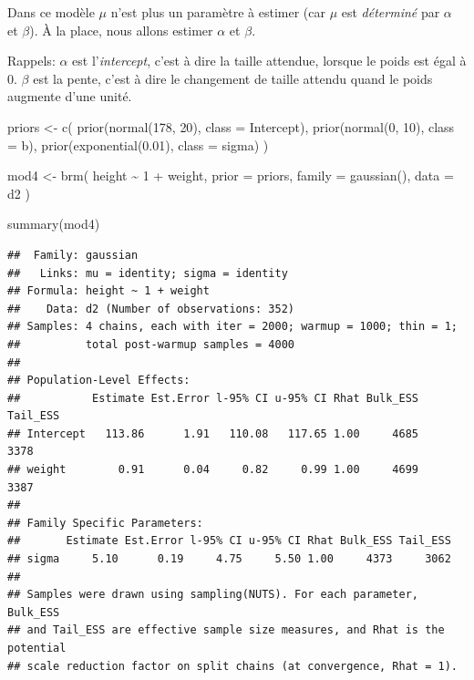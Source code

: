 \documentclass[
  a4paper,11pt,twoside,onecolumn,openright,final,oldfontcommands]{memoir}
\newenvironment{Shaded}{\begin{snugshade}}{\end{snugshade}}
\newcommand{\AttributeTok}[1]{\textcolor[rgb]{0.77,0.63,0.00}{#1}}
\newcommand{\DecValTok}[1]{\textcolor[rgb]{0.00,0.00,0.81}{#1}}
\newcommand{\FloatTok}[1]{\textcolor[rgb]{0.00,0.00,0.81}{#1}}
\newcommand{\FunctionTok}[1]{\textcolor[rgb]{0.00,0.00,0.00}{#1}}
\newcommand{\NormalTok}[1]{#1}
\newcommand{\OtherTok}[1]{\textcolor[rgb]{0.56,0.35,0.01}{#1}}
\newcommand{\SpecialCharTok}[1]{\textcolor[rgb]{0.00,0.00,0.00}{#1}}
\theoremstyle{definition}
\theoremstyle{definition}
\theoremstyle{definition}
\theoremstyle{remark}
\begin{document}
Dans ce modèle \(\mu\) n'est plus un paramètre à estimer (car \(\mu\) est \emph{déterminé} par \(\alpha\) et \(\beta\)). À la place, nous allons estimer \(\alpha\) et \(\beta\).

Rappels: \(\alpha\) est l'\emph{intercept}, c'est à dire la taille attendue, lorsque le poids est égal à \(0\). \(\beta\) est la pente, c'est à dire le changement de taille attendu quand le poids augmente d'une unité.

\begin{Shaded}
\begin{Highlighting}[]
\NormalTok{priors }\OtherTok{\textless{}{-}} \FunctionTok{c}\NormalTok{(}
  \FunctionTok{prior}\NormalTok{(}\FunctionTok{normal}\NormalTok{(}\DecValTok{178}\NormalTok{, }\DecValTok{20}\NormalTok{), }\AttributeTok{class =}\NormalTok{ Intercept),}
  \FunctionTok{prior}\NormalTok{(}\FunctionTok{normal}\NormalTok{(}\DecValTok{0}\NormalTok{, }\DecValTok{10}\NormalTok{), }\AttributeTok{class =}\NormalTok{ b),}
  \FunctionTok{prior}\NormalTok{(}\FunctionTok{exponential}\NormalTok{(}\FloatTok{0.01}\NormalTok{), }\AttributeTok{class =}\NormalTok{ sigma)}
\NormalTok{  )}

\NormalTok{mod4 }\OtherTok{\textless{}{-}} \FunctionTok{brm}\NormalTok{(}
\NormalTok{  height }\SpecialCharTok{\textasciitilde{}} \DecValTok{1} \SpecialCharTok{+}\NormalTok{ weight,}
  \AttributeTok{prior =}\NormalTok{ priors,}
  \AttributeTok{family =} \FunctionTok{gaussian}\NormalTok{(),}
  \AttributeTok{data =}\NormalTok{ d2}
\NormalTok{  )}
\end{Highlighting}
\end{Shaded}

\begin{Shaded}
\begin{Highlighting}[]
\FunctionTok{summary}\NormalTok{(mod4)}
\end{Highlighting}
\end{Shaded}

\begin{verbatim}
##  Family: gaussian 
##   Links: mu = identity; sigma = identity 
## Formula: height ~ 1 + weight 
##    Data: d2 (Number of observations: 352) 
## Samples: 4 chains, each with iter = 2000; warmup = 1000; thin = 1;
##          total post-warmup samples = 4000
## 
## Population-Level Effects: 
##           Estimate Est.Error l-95% CI u-95% CI Rhat Bulk_ESS Tail_ESS
## Intercept   113.86      1.91   110.08   117.65 1.00     4685     3378
## weight        0.91      0.04     0.82     0.99 1.00     4699     3387
## 
## Family Specific Parameters: 
##       Estimate Est.Error l-95% CI u-95% CI Rhat Bulk_ESS Tail_ESS
## sigma     5.10      0.19     4.75     5.50 1.00     4373     3062
## 
## Samples were drawn using sampling(NUTS). For each parameter, Bulk_ESS
## and Tail_ESS are effective sample size measures, and Rhat is the potential
## scale reduction factor on split chains (at convergence, Rhat = 1).
\end{verbatim}
\end{document}
